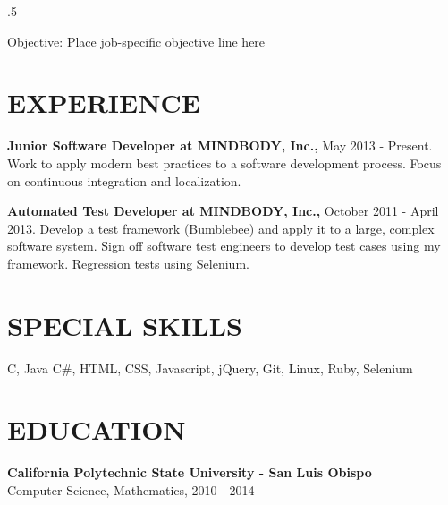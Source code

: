 \documentclass{res}
\begin{document}
 
\thispagestyle{empty} %
\address{375 Highland Blvd\\
San Luis Obispo, CA 93405\\
(707) 548 - 9187}


\begin{resume}
\vspace{0.1in}
\moveleft.5\sectionwidth\centerline{Objective: Place job-specific objective line here}  
 
\section{EXPERIENCE} 
\vspace{0.1in} 
    {\bf Junior Software Developer at MINDBODY, Inc.,} May 2013 - Present.
    Work to apply modern best practices to a software development process.
    Focus on continuous integration and localization.

 
    {\bf Automated Test Developer at MINDBODY, Inc.,} October 2011 - April 2013.
    Develop a test framework (Bumblebee) and apply it to a large, complex software
    system. Sign off software test engineers to develop test cases using my
    framework. Regression tests using Selenium.

\section{SPECIAL SKILLS} 
\vspace{0.1in} 
    C, Java C\#, HTML, CSS, Javascript, jQuery, Git, Linux, Ruby, Selenium
    
\section{EDUCATION}
\vspace{0.1in} 
 
    {\bf California Polytechnic State University - San Luis Obispo} \\
    Computer Science, Mathematics, 2010 - 2014
    
    

\end{resume}
\end{document}
